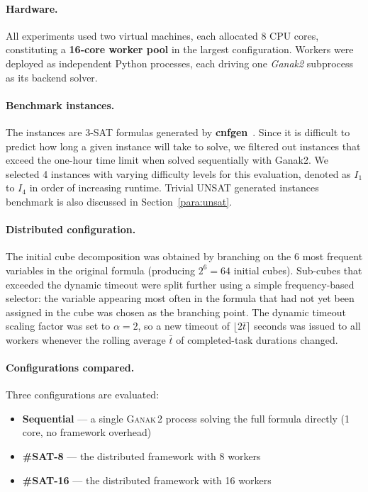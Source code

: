 \documentclass{report}
\begin{document}
\paragraph{Hardware.}
All experiments used two virtual machines, each allocated 8 CPU cores,
constituting a \textbf{16-core worker pool} in the largest configuration.
Workers were deployed as independent Python processes, each driving one
\emph{Ganak2} subprocess as its backend solver.

\paragraph{Benchmark instances.}
The instances are 3-SAT formulas generated by \textbf{cnfgen}~\cite{cnf_gen}.
Since it is difficult to predict how long a given instance will take to solve, 
we filtered out instances that exceed the one-hour time limit when solved sequentially with Ganak2.
We selected 4 instances with varying difficulty levels for this evaluation, denoted as $I_1$ to $I_4$ in order of increasing runtime.
Trivial UNSAT generated instances benchmark is also discussed in Section~\ref{para:unsat}.

\paragraph{Distributed configuration.}
The initial cube decomposition was obtained by branching on the 6 most frequent
variables in the original formula (producing $2^6 = 64$ initial cubes).
Sub-cubes that exceeded the dynamic timeout were split further using a simple
frequency-based selector: the variable appearing most often in the formula that
had not yet been assigned in the cube was chosen as the branching point.
The dynamic timeout scaling factor was set to $\alpha = 2$, so a new timeout of
$\lfloor 2\bar{t} \rceil$ seconds was issued to all workers whenever the
rolling average $\bar{t}$ of completed-task durations changed.

\paragraph{Configurations compared.}
Three configurations are evaluated:
\begin{itemize}
    \item \textbf{Sequential} — a single \textsc{Ganak\,2} process solving the
          full formula directly (1 core, no framework overhead)
    \item \textbf{\#SAT-8} — the distributed framework with 8 workers
    \item \textbf{\#SAT-16} — the distributed framework with 16 workers
\end{itemize}
\end{document}
